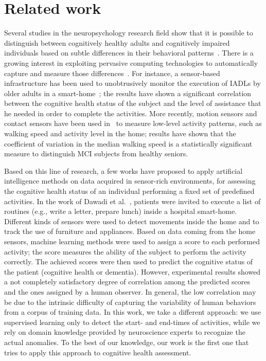 \documentclass[10pt, conference, compsocconf]{IEEEtran}
\begin{document}
\section{Related work}
\label{sec:related}
Several studies in the neuropsychology research field show that it is possible to distinguish between cognitively healthy adults and cognitively impaired individuals based on subtle differences in their behavioral patterns~\cite{WPK04}. There is a growing interest in exploiting pervasive computing technologies to automatically capture and measure those differences~\cite{PS13}. For instance, a sensor-based infrastructure has been used to unobtrusively monitor the execution of IADLs by older adults in a smart-home~\cite{SSC13}; the results have shown a significant correlation between the cognitive health status of the subject and the level of assistance that he needed in order to complete the activities. More recently, motion sensors and contact sensors have been used in~\cite{HAA08} to measure low-level activity patterns, such as  walking speed and activity level in the home; results have shown that the coefficient of variation in the median walking speed is a statistically significant measure to distinguish MCI subjects from healthy seniors.

Based on this line of research, a few works have proposed to apply artificial intelligence methods on data acquired in sensor-rich environments, for assessing the cognitive health status of an individual performing a fixed set of predefined activities. In the work of Dawadi et al.~\cite{DCS13}, patients were invited to execute a list of routines (e.g., write a letter, prepare lunch) inside a hospital smart-home. Different kinds of sensors were used to detect movements inside the home and to track the use of furniture and appliances. Based on data coming from the home sensors, machine learning methods were used to assign a score to each performed activity; the score measures the ability of the subject to perform the activity correctly. The achieved scores were then used to predict the cognitive status of the patient (cognitive health or dementia). However, experimental results showed a not completely satisfactory degree of correlation among the predicted scores and the ones assigned by a human observer. In general, the low correlation may be due to the intrinsic difficulty of capturing the variability of human behaviors from a corpus of training data. In this work, we take a different approach: we use supervised learning only to detect the start- and end-times of activities, while we rely on domain knowledge provided by neuroscience experts to recognize the actual anomalies. To the best of our knowledge, our work is the first one that tries to apply this approach to cognitive health assessment.
\end{document}
